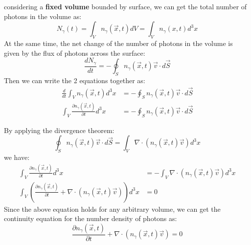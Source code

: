 \bigskip \noindent
\begin{foundation}
    considering a \textbf{fixed volume} bounded by surface, we can get the total number of photons in the volume as:
    \[
        N_\gamma(t) = \int_V n_\gamma(\vec{x},t) dV = \int_V n_\gamma(x,t) d^3 x
    \]
    At the same time, the net change of the number of photons in the volume is given by the flux of photons across the surface:
    \[
        \frac{dN_\gamma}{dt} = - \oint_S n_\gamma(\vec{x},t) \vec{v} \cdot d\vec{S}
    \]
    Then we can write the 2 equations together as:
    \begin{align*}
        \frac{d}{dt} \int_V n_\gamma(\vec{x},t) d^3 x &= - \oint_S n_\gamma(\vec{x},t) \vec{v} \cdot d\vec{S} \\
        \int_V \frac{\partial n_\gamma(\vec{x},t)}{\partial t} d^3 x &= - \oint_S n_\gamma(\vec{x},t) \vec{v} \cdot d\vec{S}
    \end{align*}

    By applying the divergence theorem:
    \[
        \oint_S n_\gamma(\vec{x},t) \vec{v} \cdot d\vec{S} = \int_V \nabla \cdot (n_\gamma(\vec{x},t) \vec{v}) d^3 x
    \]
    we have:
    \begin{align*}
        \int_V \frac{\partial n_\gamma(\vec{x},t)}{\partial t} d^3 x &= - \int_V \nabla \cdot (n_\gamma(\vec{x},t) \vec{v}) d^3 x \\
        \int_V \left( \frac{\partial n_\gamma(\vec{x},t)}{\partial t} + \nabla \cdot (n_\gamma(\vec{x},t) \vec{v}) \right) d^3 x &= 0
    \end{align*}
    Since the above equation holds for any arbitrary volume, we can get the continuity equation for the number density of photons as:
    \[
        \frac{\partial n_\gamma(\vec{x},t)}{\partial t} + \nabla \cdot (n_\gamma(\vec{x},t) \vec{v}) = 0
    \]
\end{foundation}

